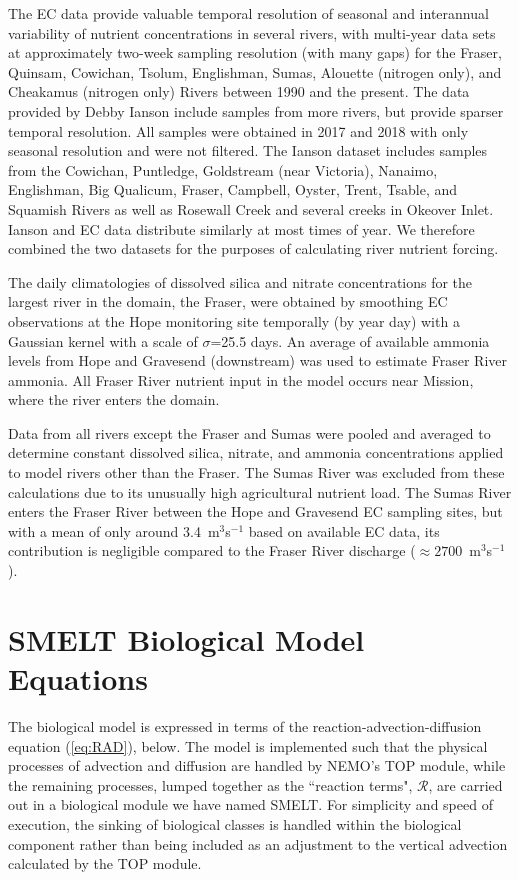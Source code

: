 \documentclass[draft,jgrga]{agutexSI2019}
\begin{document}
\begin{article}
The EC data provide valuable temporal resolution of seasonal and interannual variability of nutrient concentrations in several rivers, 
with multi-year data sets at approximately two-week sampling resolution (with many gaps) for the 
Fraser, Quinsam, Cowichan, Tsolum, Englishman, Sumas, Alouette (nitrogen only), and Cheakamus (nitrogen only) Rivers between 1990 and the present. 
The data provided by Debby Ianson include samples from more rivers, but provide sparser temporal resolution. 
All samples were obtained in 2017 and 2018 with only seasonal resolution and were not filtered. 
The Ianson dataset includes samples from the Cowichan, Puntledge, Goldstream (near Victoria), Nanaimo, Englishman, Big Qualicum, 
Fraser, Campbell, Oyster, Trent, Tsable, and Squamish Rivers as well as Rosewall Creek and several creeks in Okeover Inlet. 
Ianson and EC data distribute similarly at most times of year. 
We therefore combined the two datasets for the purposes of calculating river nutrient forcing. 

The daily climatologies of dissolved silica and nitrate concentrations for the largest river in the domain, the Fraser, 
were obtained by smoothing EC observations at the Hope monitoring site temporally (by year day) with a Gaussian kernel with a scale of $\sigma$=25.5 days. 
An average of available ammonia levels from Hope and Gravesend (downstream) was used to estimate Fraser River ammonia. All Fraser River nutrient input in the model occurs near Mission, where the river enters the domain. 

Data from all rivers except the Fraser and Sumas were pooled and averaged to determine constant dissolved silica, nitrate, and ammonia concentrations 
applied to model rivers other than the Fraser. 
The Sumas River was excluded from these calculations due to its unusually high agricultural nutrient load. 
The Sumas River enters the Fraser River between the Hope and Gravesend EC sampling sites, 
but with a mean of only around 3.4~m$^3$s$^{-1}$ based on available EC data, its contribution is negligible compared to the Fraser River discharge ($\approx2700$~m$^3$s$^{-1}$).

\clearpage
\section{SMELT Biological Model Equations}
\label{sec:ModEq}

The biological model is expressed in terms of the reaction-advection-diffusion equation (\ref{eq:RAD}), below.
The model is implemented such that the physical processes of advection and diffusion are handled by NEMO's TOP module, 
while the remaining processes, lumped together as the ``reaction terms", $\mathcal{R}$, are carried out in a biological module we have named SMELT. 
For simplicity and speed of execution, the sinking of biological classes is handled within the biological component rather than being included as an adjustment to the vertical advection calculated by the TOP module.


\end{article}
\end{document}
